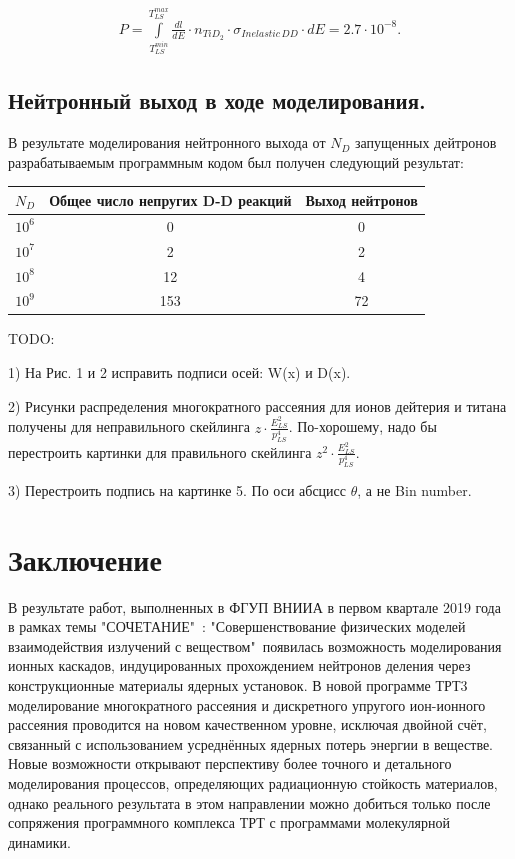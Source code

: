 \documentclass[a4paper,12pt]{article}
\begin{document}
\begin{large}
\begin{equation}
\label{ProbabilityOfNeutronOutputPer1Deuteron}
\begin{aligned} 
  P = \int \limits^{T^{max}_{LS}}_{T^{min}_{LS}} \frac{dl}{dE} \cdot n_{TiD_2} \cdot \sigma_{Inelastic\,DD} \cdot dE = 2.7 \cdot 10^{-8}.
\end{aligned}
\end{equation}

\subsection{Нейтронный выход в ходе моделирования.}
\label{NeutronOutputInModelling}

	В результате моделирования нейтронного выхода от $N_D$ запущенных дейтронов разрабатываемым программным кодом был получен следующий результат:
	
\begin{tabular}{|c|c|c|}
 \hline 
 $N_D$ & Общее число непругих D-D реакций & Выход нейтронов \\ 
 \hline 
 $10^6$ & 0 & 0 \\ 
 \hline 
 $10^7$ & 2 & 2 \\ 
 \hline 
 $10^8$ & 12 & 4 \\ 
 \hline 
 $10^9$ & 153 & 72 \\ 
 \hline 
 \end{tabular}
 
 
 


	TODO:
	
	1) На Рис. 1 и 2 исправить подписи осей: W(x) и D(x).
	
	2) Рисунки распределения многократного рассеяния для ионов дейтерия и титана получены для 		неправильного скейлинга $z \cdot \frac{E^2_{LS}}{p^4_{LS}}$. По-хорошему, надо бы перестроить картинки для правильного скейлинга $z^2 \cdot \frac{E^2_{LS}}{p^4_{LS}}$.
	
	3) Перестроить подпись на картинке 5. По оси абсцисс $\theta$, а не Bin number.
 

	
\clearpage
\section{Заключение}
\label{Conclusion}
  В результате работ, выполненных в ФГУП ВНИИА в первом квартале 2019 года в рамках темы "СОЧЕТАНИЕ"\ : "Совершенствование физических моделей взаимодействия излучений с веществом"\ появилась возможность моделирования ионных каскадов, индуцированных прохождением нейтронов деления через конструкционные материалы ядерных установок.
  В новой программе ТРТ3 моделирование многократного рассеяния и дискретного упругого ион-ионного рассеяния проводится на новом качественном уровне, исключая двойной счёт, связанный с использованием усреднённых ядерных потерь энергии в веществе.
  Новые возможности открывают перспективу более точного и детального моделирования процессов, определяющих радиационную стойкость материалов, однако реального результата в этом направлении можно добиться только после сопряжения программного комплекса ТРТ с программами молекулярной динамики.
  
\clearpage



\end{large}
\end{document}
